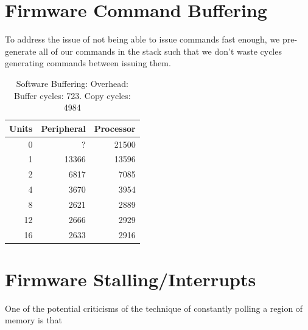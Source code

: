 \documentclass[a4paper,8pt]{report}
\begin{document}



\section{Firmware Command Buffering}
To address the issue of not being able to issue commands fast enough, we
pre-generate all of our commands in the stack such that we don't waste cycles
generating commands between issuing them.


\begin{table}
  \centering
  \begin{tabular}{r|rr}
    \toprule
    Units & Peripheral & Processor\\
    \midrule
    0  &     ? & 21500 \\
    1  & 13366 & 13596 \\
    2  &  6817 &  7085 \\
    4  &  3670 &  3954 \\
    8  &  2621 &  2889 \\
    12 &  2666 &  2929 \\
    16 &  2633 &  2916 \\
    \bottomrule
  \end{tabular}
  \caption{Software Buffering: Overhead: Buffer cycles: 723. Copy cycles: 4984}
\end{table}



\section{Firmware Stalling/Interrupts}
One of the potential criticisms of the technique of constantly polling a region
of memory is that
\end{document}
